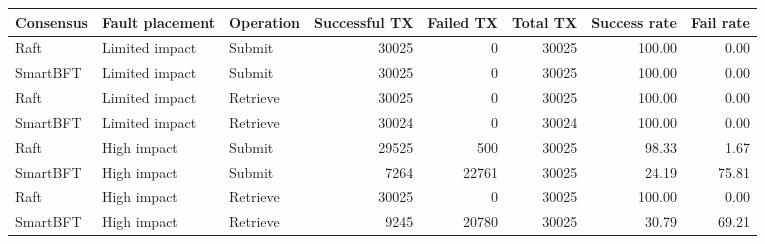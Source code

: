 \begin{tabular}{lllrrrrr}
\hline
Consensus & Fault placement & Operation & Successful TX & Failed TX & Total TX & Success rate & Fail rate \\
\hline
Raft & Limited impact & Submit & 30025 & 0 & 30025 & 100.00 & 0.00 \\
SmartBFT & Limited impact & Submit & 30025 & 0 & 30025 & 100.00 & 0.00 \\
Raft & Limited impact & Retrieve & 30025 & 0 & 30025 & 100.00 & 0.00 \\
SmartBFT & Limited impact & Retrieve & 30024 & 0 & 30024 & 100.00 & 0.00 \\
Raft & High impact & Submit & 29525 & 500 & 30025 & 98.33 & 1.67 \\
SmartBFT & High impact & Submit & 7264 & 22761 & 30025 & 24.19 & 75.81 \\
Raft & High impact & Retrieve & 30025 & 0 & 30025 & 100.00 & 0.00 \\
SmartBFT & High impact & Retrieve & 9245 & 20780 & 30025 & 30.79 & 69.21 \\
\hline
\end{tabular}